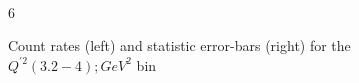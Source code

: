 \begin{figure}[!htb]
 \centering
   \begin{subfigure}{0.48 \tw}
  \caption{}
  \label{fig:PHI_DVCS_rates_2}
 \end{subfigure}
 \begin{subfigure}{0.48 \tw}
  \caption{}
  \label{fig:Asym_errorbars_2}
 \end{subfigure}\\
\caption{Count rates (left) and statistic error-bars (right) for the $Q^{\prime2}(3.2 - 4); GeV^{2}$ bin}6
\label{fig:counts_and_errorbars2}
\end{figure}
